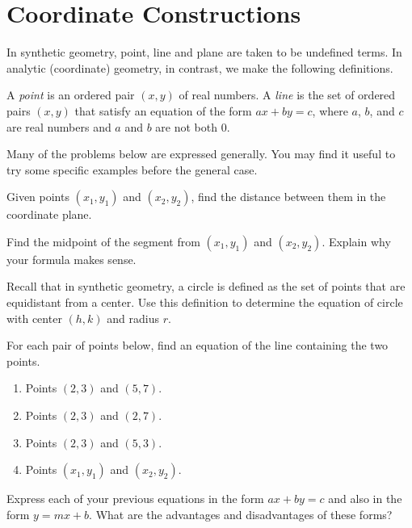 \newpage
\section{Coordinate Constructions}
In synthetic geometry, point, line and plane are taken to be undefined terms.  In analytic (coordinate) geometry, in contrast, we make the following definitions.  
\begin{definition}
A \emph{point} is an ordered pair $(x,y)$ of real numbers. A \emph{line} is the set of ordered pairs $(x,y)$ that satisfy an equation of the form $ax + by = c$, where $a$, $b$, and $c$ are real numbers and $a$ and $b$ are not both 0.   
\end{definition}

Many of the problems below are expressed generally.  You may find it useful to try some specific examples before the general case.  


\begin{prob}
Given points $(x_1, y_1)$ and $(x_2, y_2)$, find the distance between them in the coordinate plane.
\end{prob}

\begin{prob}
Find the midpoint of the segment from $(x_1, y_1)$ and $(x_2, y_2)$.  Explain why your formula makes sense. 
\end{prob}

\begin{prob}
Recall that in synthetic geometry, a circle is defined as the set of points that are equidistant from a center.  Use this definition to determine the equation of circle with center $(h, k)$ and radius $r$.  
\end{prob}

\begin{prob}
For each pair of points below, find an equation of the line containing the two points.  
\begin{enumerate}
\item Points $(2,3)$ and $(5,7)$.  
\item Points $(2,3)$ and $(2,7)$.  
\item Points $(2,3)$ and $(5,3)$. 
\item Points $(x_1, y_1)$ and $(x_2, y_2)$.  
\end{enumerate}
\end{prob}

\begin{prob}
Express each of your previous equations in the form $ax + by = c$ and also in the form $y = mx + b$.   What are the advantages and disadvantages of these forms?  
\end{prob}

